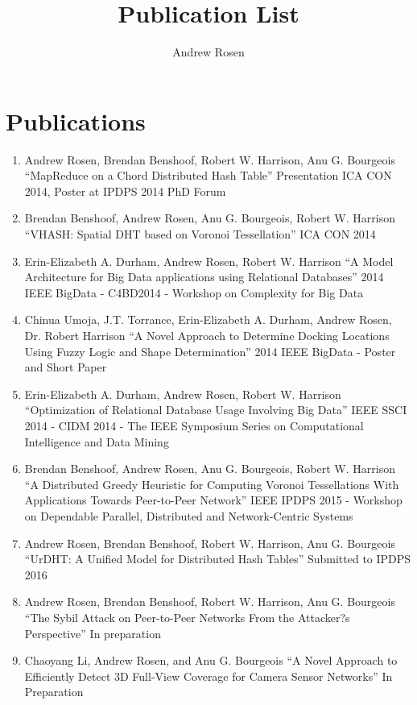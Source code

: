 \documentclass[12pt,a4paper]{article}
\author{Andrew Rosen}
\title{Publication List}
\date{}
\begin{document}
	\maketitle
	\section*{Publications}
	\begin{enumerate}
		\item Andrew Rosen, Brendan Benshoof, Robert W. Harrison, Anu G. Bourgeois
		``MapReduce on a Chord Distributed Hash Table''
		Presentation ICA CON 2014, Poster at IPDPS 2014 PhD Forum
		\item Brendan Benshoof, Andrew Rosen, Anu G. Bourgeois, Robert W. Harrison
		``VHASH: Spatial DHT based on Voronoi Tessellation''
		ICA CON 2014
		\item  Erin-Elizabeth A. Durham, Andrew Rosen, Robert W. Harrison
		``A Model Architecture for Big Data applications using Relational Databases''
		2014 IEEE BigData - C4BD2014 - Workshop on Complexity for Big Data
		\item Chinua Umoja, J.T. Torrance, Erin-Elizabeth A. Durham, Andrew Rosen, Dr. Robert Harrison
		``A Novel Approach to Determine Docking Locations Using Fuzzy Logic and Shape Determination''
		2014 IEEE BigData - Poster and Short Paper
		\item  Erin-Elizabeth A. Durham, Andrew Rosen, Robert W. Harrison
		``Optimization of Relational Database Usage Involving Big Data''
		IEEE SSCI 2014 - CIDM 2014 - The IEEE Symposium Series on Computational Intelligence and Data Mining
		\item Brendan Benshoof, Andrew Rosen, Anu G. Bourgeois, Robert W. Harrison
		``A Distributed Greedy Heuristic for Computing Voronoi Tessellations With Applications Towards Peer-to-Peer Network''
		IEEE IPDPS 2015 - Workshop on Dependable Parallel, Distributed and Network-Centric Systems
		\item Andrew Rosen, Brendan Benshoof, Robert W. Harrison, Anu G. Bourgeois
		``UrDHT: A Unified Model for Distributed Hash Tables''
		Submitted to IPDPS 2016
		\item Andrew Rosen, Brendan Benshoof, Robert W. Harrison, Anu G. Bourgeois
		``The Sybil Attack on Peer-to-Peer Networks From the Attacker?s Perspective''
		In preparation
		\item Chaoyang Li, Andrew Rosen,  and Anu G. Bourgeois
		``A Novel Approach to Efficiently Detect 3D Full-View Coverage for Camera Sensor Networks''
		In Preparation
		
	\end{enumerate}
\end{document}
